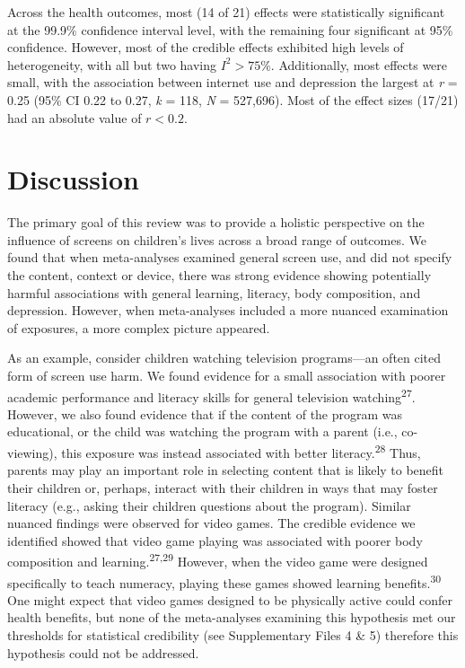\documentclass[
  english,
  man]{apa6}
\begin{document}
Across the health outcomes, most (14 of 21) effects were statistically significant at the 99.9\% confidence interval level, with the remaining four significant at 95\% confidence.
However, most of the credible effects exhibited high levels of heterogeneity, with all but two having \(I^2 > 75\%\).
Additionally, most effects were small, with the association between internet use and depression the largest at \emph{r} = 0.25 (95\% CI 0.22 to 0.27, \emph{k} = 118, \emph{N} = 527,696).
Most of the effect sizes (17/21) had an absolute value of \(r < 0.2\).

\hypertarget{discussion}{%
\section{Discussion}\label{discussion}}

The primary goal of this review was to provide a holistic perspective on the influence of screens on children's lives across a broad range of outcomes.
We found that when meta-analyses examined general screen use, and did not specify the content, context or device, there was strong evidence showing potentially harmful associations with general learning, literacy, body composition, and depression.
However, when meta-analyses included a more nuanced examination of exposures, a more complex picture appeared.

As an example, consider children watching television programs---an often cited form of screen use harm.
We found evidence for a small association with poorer academic performance and literacy skills for general television watching\textsuperscript{27}.
However, we also found evidence that if the content of the program was educational, or the child was watching the program with a parent (i.e., co-viewing), this exposure was instead associated with better literacy.\textsuperscript{28}
Thus, parents may play an important role in selecting content that is likely to benefit their children or, perhaps, interact with their children in ways that may foster literacy (e.g., asking their children questions about the program).
Similar nuanced findings were observed for video games.
The credible evidence we identified showed that video game playing was associated with poorer body composition and learning.\textsuperscript{27,29}
However, when the video game were designed specifically to teach numeracy, playing these games showed learning benefits.\textsuperscript{30}
One might expect that video games designed to be physically active could confer health benefits, but none of the meta-analyses examining this hypothesis met our thresholds for statistical credibility (see Supplementary Files 4 \& 5) therefore this hypothesis could not be addressed.
\end{document}
